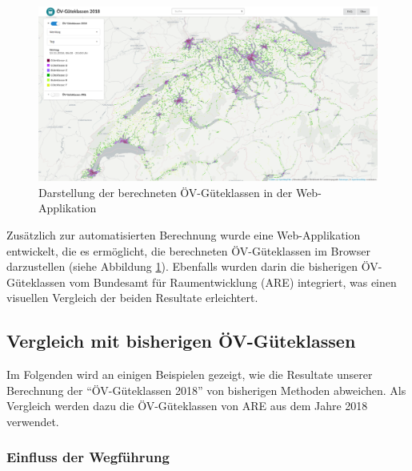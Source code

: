 \begin{landscape}
\begin{figure}[ht]
    \centering
    \includegraphics[width=1\linewidth]{technicalreport/img/resultat_oevgk18_uebersicht}
    \caption[Darstellung der berechneten ÖV-Güteklassen in der Web-Applikation]{Darstellung der berechneten ÖV-Güteklassen in der Web-Applikation}
    \label{fig:resultat_webapp_uebersicht}
\end{figure}
\end{landscape}

Zusätzlich zur automatisierten Berechnung wurde eine Web-Applikation entwickelt, die es ermöglicht, die berechneten \acs{ÖV}-Güteklassen im Browser darzustellen (siehe Abbildung \ref{fig:resultat_webapp_uebersicht}).
Ebenfalls wurden darin die bisherigen \acs{ÖV}-Güteklassen vom Bundesamt für Raumentwicklung (\acs{ARE}) integriert, was einen visuellen Vergleich der beiden Resultate erleichtert.

\subsection{Vergleich mit bisherigen ÖV-Güteklassen}
\label{Resultate:Vergleich mit bisherigen ÖV-Güteklassen}

Im Folgenden wird an einigen Beispielen gezeigt, wie die Resultate unserer Berechnung der "`\acs{ÖV}-Güteklassen 2018"' von bisherigen Methoden abweichen.
Als Vergleich werden dazu die \acs{ÖV}-Güteklassen von \ac{ARE} aus dem Jahre 2018~\cite{berechnung_are} verwendet.

\subsubsection{Einfluss der Wegführung}

